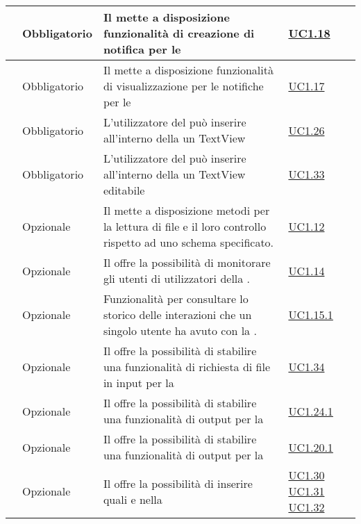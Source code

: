 \begin{longtable}{|P{1.5cm}|P{2.5cm}|P{6.5cm}|P{2.5cm}|}
	\hline \RequisitoObF\label{L15} & Obbligatorio & Il  mette a disposizione funzionalità di creazione di notifica per le  & \hyperref[UC1.18]{UC1.18} \\
	\hline \RequisitoObF\label{L16} & Obbligatorio & Il  mette a disposizione funzionalità di visualizzazione per le notifiche per le  & \hyperref[UC1.17]{UC1.17} \\
	\hline \RequisitoObF\label{L33} & Obbligatorio & L'utilizzatore del  può inserire all'interno della  un TextView & \hyperref[UC1.26]{UC1.26} \\
	\hline \RequisitoObF\label{L34} & Obbligatorio & L'utilizzatore del  può inserire all'interno della  un TextView editabile & \hyperref[UC1.33]{UC1.33} \\
	\hline \RequisitoOpF\label{L35} & Opzionale & Il  mette a disposizione metodi per la lettura di file  e il loro controllo rispetto ad uno schema specificato. & \hyperref[UC1.12]{UC1.12} \\
	\hline \RequisitoOpF\label{L36} & Opzionale & Il  offre la possibilità di monitorare gli utenti di  utilizzatori della . & \hyperref[UC1.14]{UC1.14} \\
	\hline \RequisitoOpF\label{L37} & Opzionale & Funzionalità per consultare lo storico delle interazioni che un singolo utente ha avuto con la . & \hyperref[UC1.15.1]{UC1.15.1} \\
	\hline \RequisitoOpF\label{L38} & Opzionale & Il  offre la possibilità di stabilire una funzionalità di richiesta di file in input per la  & \hyperref[UC1.34]{UC1.34} \\
	\hline \RequisitoOpF\label{L39} & Opzionale & Il  offre la possibilità di stabilire una funzionalità di output per la  & \hyperref[UC1.24.1]{UC1.24.1} \\
	\hline \RequisitoOpF\label{L40} & Opzionale & Il  offre la possibilità di stabilire una funzionalità di output  per la  & \hyperref[UC1.20.1]{UC1.20.1} \\	
	\hline \RequisitoOpF\label{L41} & Opzionale & Il  offre la possibilità di inserire  quali  e  nella  & \hyperref[UC1.30]{UC1.30} \linebreak \hyperref[UC1.31]{UC1.31} \linebreak \hyperref[UC1.32]{UC1.32} \\

\end{longtable}
